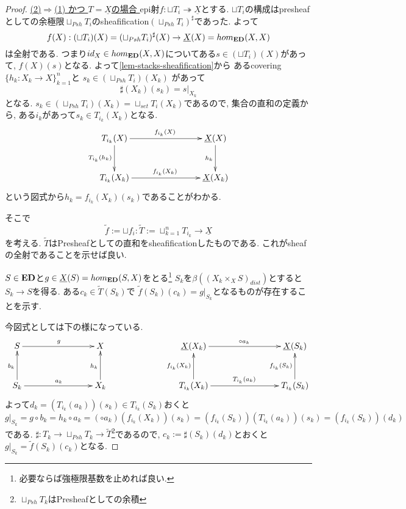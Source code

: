 \documentclass[dvipdfmx,a4paper,11pt]{article}
\theoremstyle{definition}
\begin{document}
\begin{proof}
\underline{(2)$\Rightarrow$(1) かつ $T = \underline{X}$の場合 }
epi射$f : \sqcup T_i \twoheadrightarrow \underline{X}$とする.
$\sqcup T_i $の構成はpresheafとしての余極限$\sqcup_{Psh} T_i $のsheafification$(\sqcup_{Psh} T_i )^{\sharp}$であった.
よって
$$
f(X) : (\sqcup T_i)(X) = (\sqcup_{Psh} T_i )^{\sharp}(X) \to \underline{X}(X)=hom_{{\bf ED}}(X,X)
$$ 
は全射である. 
つまり$id_{X} \in  hom_{{\bf ED}}(X,X)$についてある$s \in (\sqcup T_i)(X)$があって, $f(X)(s)$となる.
よって\ref{lem-stacks-sheafification}から
あるcovering$\{h_k : X_k \to X\}_{k=1}^{n}$と
$s_k \in (\sqcup_{Psh} T_i )(X_k)$
があって
$$
\sharp(X_k)(s_k)= s|_{X_k}
$$
となる. 
$s_k \in (\sqcup_{Psh} T_i) (X_k) = \sqcup_{set} T_{i}(X_k)$であるので, 
集合の直和の定義から, 
ある$i_k$があって$s_k \in T_{i_k}(X_k)$となる. 
\begin{equation*}
\xymatrix@C=80pt@R=30pt{
T_{i_k}(X)\ar@{->}[r]^{f_{i_k}(X)}\ar@{->}[d]_{T_{i_k}(h_k)}
&\underline{X}(X) \ar@{->}[d]_{h_k} \\
T_{i_k}(X_k) \ar@{->}[r]^{f_{i_k}(X_k)}
&\underline{X}(X_k) \\   
}
\end{equation*}
という図式から$h_{k} = f_{i_k}(X_k)(s_k)$であることがわかる. 

そこで
$$
\widetilde{f}:=\sqcup f_i : \widetilde{T}:=\sqcup_{k=1}^{n} T_{i_k} \to \underline{X}
$$
を考える. $\widetilde{T}$はPresheafとしての直和をsheafificationしたものである.
これがsheafの全射であることを示せば良い.

$S \in {\bf ED}$と$g \in \underline{X}(S) = hom_{{\bf ED}}(S,X)$をとる\footnote{必要ならば強極限基数を止めれば良い.}
$S_k$を$\beta((X_{k} \times_{X} S)_{dist})$とすると$S_k \to S$を得る.
ある$c_k \in \widetilde{T}(S_k)$で
$\widetilde{f}(S_k)(c_k) = g|_{S_k}$となるものが存在することを示す.

今図式としては下の様になっている. 
\begin{equation*}
\xymatrix@C=80pt@R=30pt{
S \ar@{->}[r]^{g}
&X
&
\underline{X}(X_k) \ar@{->}[r]^{\circ a_k}
&\underline{X}(S_k) \\
S_k \ar@{->}[r]^{a_k} \ar@{->}[u]^{b_k}
&X_k \ar@{->}[u]^{h_k}
&
T_{i_k}(X_k) \ar@{->}[r]^{T_{i_k}(a_k)} \ar@{->}[u]^{f_{i_k}(X_k)}
&T_{i_k}(S_k) \ar@{->}[u]^{f_{i_k}(S_k)}\\   
}
\end{equation*}
よって$d_k =(T_{i_k}(a_k))(s_k) \in T_{i_k}(S_k)$おくと
$$
g|_{S_{k}}
=
g \circ b_k
=
h_k \circ a_{k}
=(\circ a_k)(f_{i_k}(X_k))(s_k)
=
(f_{i_k}(S_k))(T_{i_k}(a_k))(s_k)
= (f_{i_k}(S_k))(d_k)
$$
である. $\sharp :T_k \to \sqcup_{Psh} T_{k} \to \widetilde{T}$\footnote{$\sqcup_{Psh} T_{k} $はPresheafとしての余積}であるので, $c_k:=\sharp(S_k)(d_k)$とおくと
$g|_{S_{k}} = \widetilde{f}(S_k)(c_k)$となる. 


\end{proof}
\end{document}
